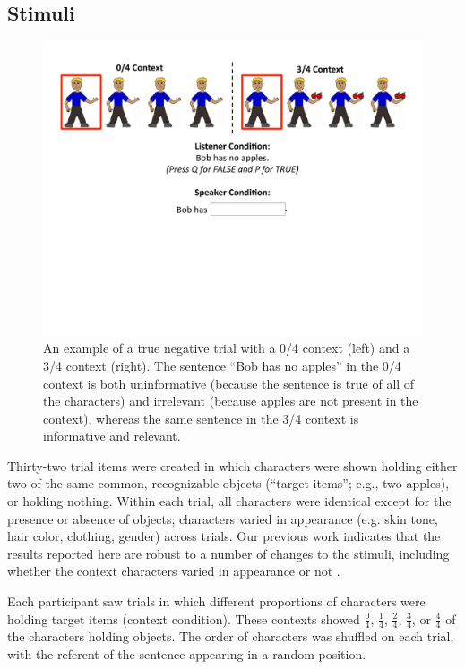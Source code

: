\documentclass[man, noapacite]{apa2}
\begin{document}
\subsection{Stimuli}

\begin{figure}[t]
\begin{center} 
\includegraphics[width=6in]{figures/trialfig.pdf}
\caption{\label{fig:trial} An example of a true negative trial with a 0/4 context (left) and a 3/4 context (right).  The sentence ``Bob has no apples'' in the 0/4 context is both uninformative (because the sentence is true of all of the characters) and irrelevant (because apples are not present in the context), whereas the same sentence in the 3/4 context is informative and relevant. }
\vspace{-5mm}
\end{center} 
\end{figure}

Thirty-two trial items were created in which characters were shown holding either two of the same common, recognizable objects (``target items''; e.g., two apples), or holding nothing.  Within each trial, all characters were identical except for the presence or absence of objects; characters varied in appearance (e.g. skin tone, hair color, clothing, gender) across trials. Our previous work indicates that the results reported here are robust to a number of changes to the stimuli, including whether the context characters varied in appearance or not \cite{nordmeyer2014}. 

Each participant saw trials in which different proportions of characters were holding target items (context condition).  These contexts showed $\frac{0}{4}$, $\frac{1}{4}$, $\frac{2}{4}$, $\frac{3}{4}$, or $\frac{4}{4}$ of the characters holding objects. The order of characters was shuffled on each trial, with the referent of the sentence appearing in a random position. 
\end{document}
